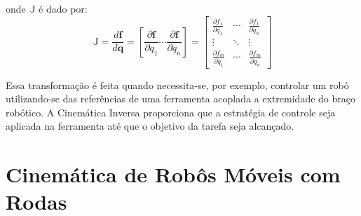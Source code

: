 onde $\mathbb{J}$ é dado por:
\begin{equation*}
    \mathbb{J}
    =
    \frac{d \mathbf{f}}{d \mathbf{q}}
    =
    \left[ \frac{\partial \mathbf{f}}{\partial q_1}
        \cdots \frac{\partial \mathbf{f}}{\partial q_n} \right]
    =
    \begin{bmatrix}
        \frac{\partial f_1}{\partial q_1} & \cdots &
        \frac{\partial f_1}{\partial q_n}                   \\
        \vdots                            & \ddots & \vdots \\
        \frac{\partial f_m}{\partial q_1} & \cdots &
        \frac{\partial f_m}{\partial q_n}
    \end{bmatrix}
\end{equation*}

Essa transformação é feita quando necessita-se, por exemplo, controlar um robô utilizando-se das referências de uma ferramenta acoplada a
extremidade do braço robótico. A Cinemática Inversa proporciona que a estratégia de controle seja aplicada na ferramenta até
que o objetivo da tarefa seja alcançado.


    




\section{Cinemática de Robôs Móveis com Rodas}

